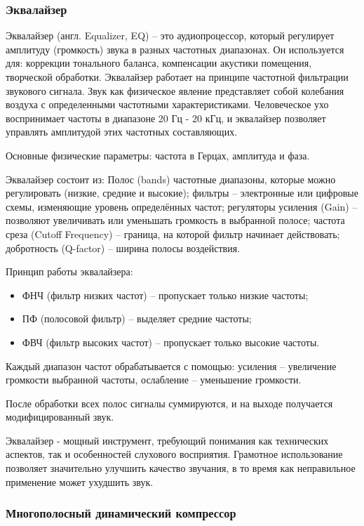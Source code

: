 \subsubsection{Эквалайзер}

Эквалайзер (англ. Equalizer, EQ) – это аудиопроцессор, который регулирует амплитуду (громкость) звука в разных частотных диапазонах. Он используется для: коррекции тонального баланса, компенсации акустики помещения, творческой обработки. Эквалайзер работает на принципе частотной фильтрации звукового сигнала. Звук как физическое явление представляет собой колебания воздуха с определенными частотными характеристиками. Человеческое ухо воспринимает частоты в диапазоне 20 Гц - 20 кГц, и эквалайзер позволяет управлять амплитудой этих частотных составляющих.

Основные физические параметры: частота в Герцах, амплитуда и фаза.

Эквалайзер состоит из: Полос (bands) частотные диапазоны, которые можно регулировать (низкие, средние и высокие); фильтры – электронные или цифровые схемы, изменяющие уровень определённых частот; регуляторы усиления (Gain) – позволяют увеличивать или уменьшать громкость в выбранной полосе; частота среза (Cutoff Frequency) – граница, на которой фильтр начинает действовать; добротность (Q-factor) – ширина полосы воздействия.

Принцип работы эквалайзера:
\begin{itemize}
	\item ФНЧ (фильтр низких частот) – пропускает только низкие частоты;
	\item ПФ (полосовой фильтр) – выделяет средние частоты;
	\item ФВЧ (фильтр высоких частот) – пропускает только высокие частоты.
\end{itemize}

Каждый диапазон частот обрабатывается с помощью: усиления – увеличение громкости выбранной частоты, ослабление – уменьшение громкости.

После обработки всех полос сигналы суммируются, и на выходе получается модифицированный звук.

Эквалайзер - мощный инструмент, требующий понимания как технических аспектов, так и особенностей слухового восприятия. Грамотное использование позволяет значительно улучшить качество звучания, в то время как неправильное применение может ухудшить звук.

\subsubsection{Многополосный динамический компрессор}


